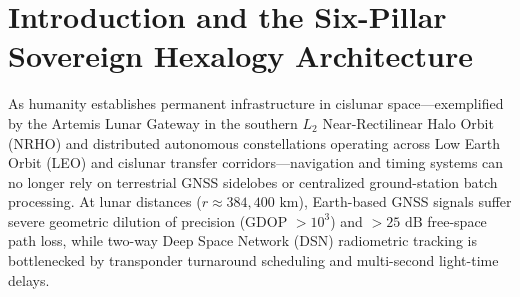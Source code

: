 \documentclass[11pt,a4paper,reqno]{article}
\theoremstyle{plain}
\theoremstyle{definition}
\theoremstyle{remark}
\numberwithin{equation}{section}
\begin{document}
\clearpage
\tableofcontents
\newpage

\section{Introduction and the Six-Pillar Sovereign Hexalogy Architecture}

As humanity establishes permanent infrastructure in cislunar space---exemplified by the Artemis Lunar Gateway in the southern $L_2$ Near-Rectilinear Halo Orbit (NRHO) and distributed autonomous constellations operating across Low Earth Orbit (LEO) and cislunar transfer corridors---navigation and timing systems can no longer rely on terrestrial GNSS sidelobes or centralized ground-station batch processing. At lunar distances ($r \approx 384,400\text{ km}$), Earth-based GNSS signals suffer severe geometric dilution of precision (GDOP $> 10^3$) and $> 25\text{ dB}$ free-space path loss, while two-way Deep Space Network (DSN) radiometric tracking is bottlenecked by transponder turnaround scheduling and multi-second light-time delays.
\end{document}
